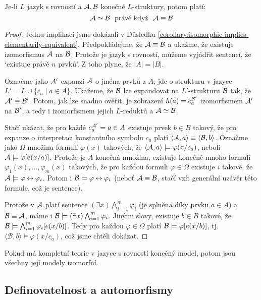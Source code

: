 \begin{proposition}
    Je-li $L$ jazyk s rovností a $\mathcal{A},\mathcal{B}$ konečné $L$-struktury, potom platí:
    $$
    \mathcal{A}\simeq\mathcal{B}\ \text{ právě když }\ \mathcal{A}\equiv\mathcal{B}
    $$
\end{proposition}
\begin{proof}
    Jednu implikaci jsme dokázali v Důsledku \ref{corollary:isomorphic-implies-elementarily-equivalent}. Předpokládejme, že $\mathcal{A}\equiv\mathcal{B}$ a ukažme, že existuje izomorfismus $\mathcal{A}$ na $\mathcal{B}$. Protože je jazyk s rovností, můžeme vyjádřit sentencí, že `existuje právě $n$ prvků'. Z toho plyne, že $|A|=|B|$.

    Označme jako $\mathcal{A}'$ expanzi $\mathcal{A}$ o jména prvků z $A$; jde o strukturu v jazyce $L'=L\cup\{c_a\mid a\in A\}$. Ukážeme, že $\mathcal{B}$ lze expandovat na $L'$-strukturu $\mathcal{B}$ tak, že $\mathcal{A}'\equiv \mathcal{B}'$. Potom, jak lze snadno ověřit, je zobrazení $h(a)= c_a^{\mathcal{B}'}$ izomorfismem $\mathcal{A}'$ na $\mathcal{B}'$, a tedy i izomorfismem jejich $L$-reduktů a $\mathcal{A}\simeq\mathcal{B}$.

    Stačí ukázat, že pro každé $c_a^{\mathcal{A}'}=a\in A$ existuje prvek $b\in B$ takový, že pro expanze o interpretaci konstantního symbolu $c_a$ platí $\langle  \mathcal{A},a\rangle\equiv\langle\mathcal{B},b\rangle$. Označme jako $\Omega$ množinu formulí $\varphi(x)$ takových, že $\langle \mathcal{A},a\rangle \models \varphi(x/c_a)$, neboli $\mathcal{A}\models \varphi[e(x/a)]$. Protože je $A$ konečná množina, existuje konečně mnoho formulí $\varphi_1(x),\dots,\varphi_m(x)$ takových, že pro každou formuli $\varphi \in \Omega$ existuje $i$ takové, že $\mathcal{A}\models \varphi\mathbin{\leftrightarrow}\varphi_i$. Potom i $\mathcal{B}\models\varphi\mathbin{\leftrightarrow}\varphi_i$ (neboť $\mathcal{A}\equiv\mathcal{B}$, stačí vzít generální uzávěr této formule, což je sentence).

    Protože v $\mathcal{A}$ platí sentence $(\exists x)\bigwedge_{i=1}^m\varphi_i$ (je splněna díky prvku $a\in A$) a $\mathcal{B}\equiv\mathcal{A}$, máme i $\mathcal{B}\models (\exists x)\bigwedge_{i=1}^m\varphi_i$. Jinými slovy, existuje $b\in B$ takové, že $\mathcal{B}\models\bigwedge_{i=1}^m\varphi_i[e(x/b)]$. Tedy pro každou $\varphi\in \Omega$ platí $\mathcal{B}\models \varphi[e(x/b)]$, tj. $\langle\mathcal{B},b\rangle\models \varphi(x/c_a)$, což jsme chtěli dokázat.
\end{proof}

\begin{corollary}
    Pokud má kompletní teorie v jazyce s rovností konečný model, potom jsou všechny její modely izomorfní.
\end{corollary}


\subsection{Definovatelnost a automorfismy}

